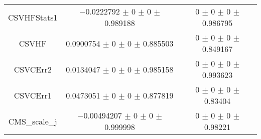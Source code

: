 \begin{table}
\begin{tabular}{ccc}
CSVHFStats1 & \num{-0.0222792} $\pm$ \num{0} $\pm$ \num{0} $\pm$ \num{0.989188} & \num{0} $\pm$ \num{0} $\pm$ \num{0} $\pm$ \num{0.986795}\\
CSVHF & \num{0.0900754} $\pm$ \num{0} $\pm$ \num{0} $\pm$ \num{0.885503} & \num{0} $\pm$ \num{0} $\pm$ \num{0} $\pm$ \num{0.849167}\\
CSVCErr2 & \num{0.0134047} $\pm$ \num{0} $\pm$ \num{0} $\pm$ \num{0.985158} & \num{0} $\pm$ \num{0} $\pm$ \num{0} $\pm$ \num{0.993623}\\
CSVCErr1 & \num{0.0473051} $\pm$ \num{0} $\pm$ \num{0} $\pm$ \num{0.877819} & \num{0} $\pm$ \num{0} $\pm$ \num{0} $\pm$ \num{0.83404}\\
CMS\_scale\_j & \num{-0.00494207} $\pm$ \num{0} $\pm$ \num{0} $\pm$ \num{0.999998} & \num{0} $\pm$ \num{0} $\pm$ \num{0} $\pm$ \num{0.98221}\\
\bottomrule
\end{tabular}
\end{table}